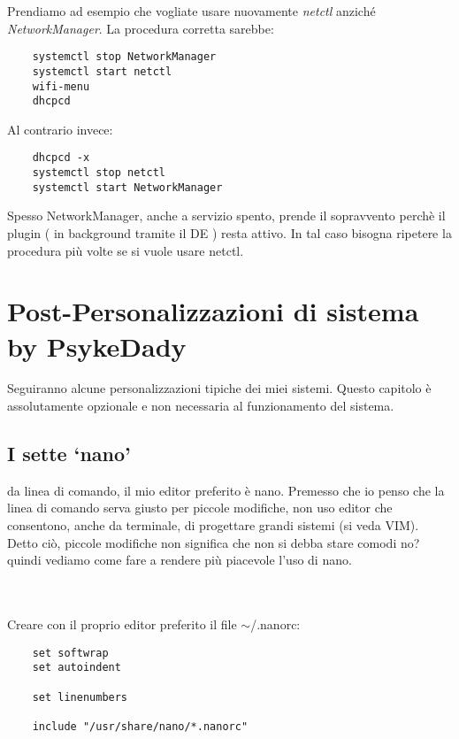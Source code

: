 \documentclass[twoside,italian]{book}
\newcommand{\nlinea}{
	\leavevmode
	\\
}
\begin{document}
			Prendiamo ad esempio che vogliate usare nuovamente \textit{netctl} anziché \textit{NetworkManager}. La procedura corretta sarebbe:
\begin{lstlisting}
	systemctl stop NetworkManager
	systemctl start netctl
	wifi-menu
	dhcpcd
\end{lstlisting}
			Al contrario invece:
\begin{lstlisting}
	dhcpcd -x
	systemctl stop netctl
	systemctl start NetworkManager
\end{lstlisting}
			
			\begin{tcolorbox}[floatplacement=b,width=\textwidth,colback={white},title={ATTENZIONE:},colbacktitle=red,coltitle=white,colupper=red]
				Spesso NetworkManager, anche a servizio spento, prende il sopravvento perchè il plugin ( in background tramite il DE ) resta attivo. In tal caso bisogna ripetere la procedura più volte se si vuole usare netctl.
			\end{tcolorbox}

	\chapter{Post-Personalizzazioni di sistema by PsykeDady}
	
		Seguiranno alcune personalizzazioni tipiche dei miei sistemi. Questo capitolo è assolutamente opzionale e non necessaria al funzionamento del sistema.
		
		\section{I sette `nano'}
			
			da linea di comando, il mio editor preferito è nano. Premesso che io penso che la linea di comando serva giusto per piccole modifiche, non uso editor che consentono, anche da terminale, di progettare grandi sistemi (si veda VIM).\\
			Detto ciò, piccole modifiche non significa che non si debba stare comodi no? quindi vediamo come fare a rendere più piacevole l'uso di nano.
			\nlinea
			\nlinea
			Creare con il proprio editor preferito il file $\sim$/.nanorc:
\begin{lstlisting}
	set softwrap
	set autoindent
	
	set linenumbers
	
	include "/usr/share/nano/*.nanorc"
\end{lstlisting}
			
\end{document}
